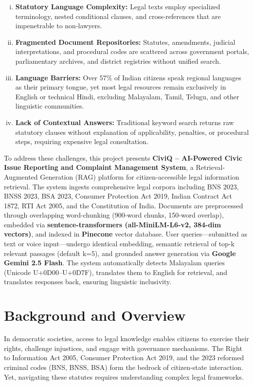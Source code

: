 \documentclass[12pt,a4paper]{report}
\begin{document}
\begin{enumerate}[(i)]
    \item \textbf{Statutory Language Complexity:} Legal texts employ specialized terminology, nested conditional clauses, and cross-references that are impenetrable to non-lawyers.
    \item \textbf{Fragmented Document Repositories:} Statutes, amendments, judicial interpretations, and procedural codes are scattered across government portals, parliamentary archives, and district registries without unified search.
    \item \textbf{Language Barriers:} Over 57\% of Indian citizens speak regional languages as their primary tongue, yet most legal resources remain exclusively in English or technical Hindi, excluding Malayalam, Tamil, Telugu, and other linguistic communities.
    \item \textbf{Lack of Contextual Answers:} Traditional keyword search returns raw statutory clauses without explanation of applicability, penalties, or procedural steps, requiring expensive legal consultation.
\end{enumerate}

To address these challenges, this project presents \textbf{CiviQ – AI-Powered Civic Issue Reporting and Complaint Management System}, a Retrieval-Augmented Generation (RAG) platform for citizen-accessible legal information retrieval. The system ingests comprehensive legal corpora including BNS 2023, BNSS 2023, BSA 2023, Consumer Protection Act 2019, Indian Contract Act 1872, RTI Act 2005, and the Constitution of India. Documents are preprocessed through overlapping word-chunking (900-word chunks, 150-word overlap), embedded via \textbf{sentence-transformers (all-MiniLM-L6-v2, 384-dim vectors)}, and indexed in \textbf{Pinecone} vector database. User queries—submitted as text or voice input—undergo identical embedding, semantic retrieval of top-k relevant passages (default k=5), and grounded answer generation via \textbf{Google Gemini 2.5 Flash}. The system automatically detects Malayalam queries (Unicode U+0D00–U+0D7F), translates them to English for retrieval, and translates responses back, ensuring linguistic inclusivity.

\section{Background and Overview}
In democratic societies, access to legal knowledge enables citizens to exercise their rights, challenge injustices, and engage with governance mechanisms. The Right to Information Act 2005, Consumer Protection Act 2019, and the 2023 reformed criminal codes (BNS, BNSS, BSA) form the bedrock of citizen-state interaction. Yet, navigating these statutes requires understanding complex legal frameworks.
\end{document}
